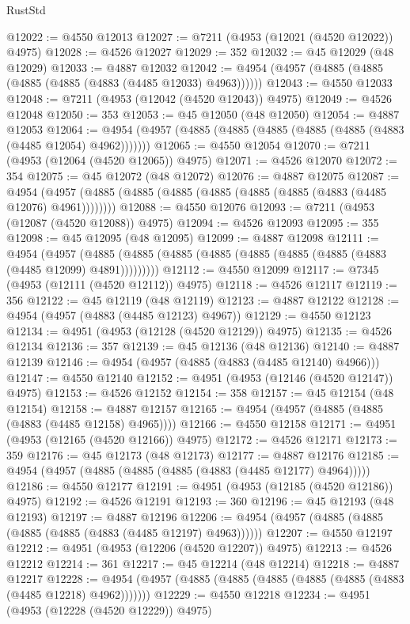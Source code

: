 \begin{lexlean}{RustStd}
\begin{coremodule}
@12022 := @4550 @12013
@12027 := @7211 (@4953 (@12021 (@4520 @12022)) @4975)
@12028 := @4526 @12027
@12029 := 352
@12032 := @45 @12029 (@48 @12029)
@12033 := @4887 @12032
@12042 := @4954 (@4957 (@4885 (@4885 (@4885 (@4885 (@4883 (@4485 @12033) @4963))))))
@12043 := @4550 @12033
@12048 := @7211 (@4953 (@12042 (@4520 @12043)) @4975)
@12049 := @4526 @12048
@12050 := 353
@12053 := @45 @12050 (@48 @12050)
@12054 := @4887 @12053
@12064 := @4954 (@4957 (@4885 (@4885 (@4885 (@4885 (@4885 (@4883 (@4485 @12054) @4962)))))))
@12065 := @4550 @12054
@12070 := @7211 (@4953 (@12064 (@4520 @12065)) @4975)
@12071 := @4526 @12070
@12072 := 354
@12075 := @45 @12072 (@48 @12072)
@12076 := @4887 @12075
@12087 := @4954 (@4957 (@4885 (@4885 (@4885 (@4885 (@4885 (@4885 (@4883 (@4485 @12076) @4961))))))))
@12088 := @4550 @12076
@12093 := @7211 (@4953 (@12087 (@4520 @12088)) @4975)
@12094 := @4526 @12093
@12095 := 355
@12098 := @45 @12095 (@48 @12095)
@12099 := @4887 @12098
@12111 := @4954
    (@4957 (@4885 (@4885 (@4885 (@4885 (@4885 (@4885 (@4885 (@4883 (@4485 @12099) @4891)))))))))
@12112 := @4550 @12099
@12117 := @7345 (@4953 (@12111 (@4520 @12112)) @4975)
@12118 := @4526 @12117
@12119 := 356
@12122 := @45 @12119 (@48 @12119)
@12123 := @4887 @12122
@12128 := @4954 (@4957 (@4883 (@4485 @12123) @4967))
@12129 := @4550 @12123
@12134 := @4951 (@4953 (@12128 (@4520 @12129)) @4975)
@12135 := @4526 @12134
@12136 := 357
@12139 := @45 @12136 (@48 @12136)
@12140 := @4887 @12139
@12146 := @4954 (@4957 (@4885 (@4883 (@4485 @12140) @4966)))
@12147 := @4550 @12140
@12152 := @4951 (@4953 (@12146 (@4520 @12147)) @4975)
@12153 := @4526 @12152
@12154 := 358
@12157 := @45 @12154 (@48 @12154)
@12158 := @4887 @12157
@12165 := @4954 (@4957 (@4885 (@4885 (@4883 (@4485 @12158) @4965))))
@12166 := @4550 @12158
@12171 := @4951 (@4953 (@12165 (@4520 @12166)) @4975)
@12172 := @4526 @12171
@12173 := 359
@12176 := @45 @12173 (@48 @12173)
@12177 := @4887 @12176
@12185 := @4954 (@4957 (@4885 (@4885 (@4885 (@4883 (@4485 @12177) @4964)))))
@12186 := @4550 @12177
@12191 := @4951 (@4953 (@12185 (@4520 @12186)) @4975)
@12192 := @4526 @12191
@12193 := 360
@12196 := @45 @12193 (@48 @12193)
@12197 := @4887 @12196
@12206 := @4954 (@4957 (@4885 (@4885 (@4885 (@4885 (@4883 (@4485 @12197) @4963))))))
@12207 := @4550 @12197
@12212 := @4951 (@4953 (@12206 (@4520 @12207)) @4975)
@12213 := @4526 @12212
@12214 := 361
@12217 := @45 @12214 (@48 @12214)
@12218 := @4887 @12217
@12228 := @4954 (@4957 (@4885 (@4885 (@4885 (@4885 (@4885 (@4883 (@4485 @12218) @4962)))))))
@12229 := @4550 @12218
@12234 := @4951 (@4953 (@12228 (@4520 @12229)) @4975)

\end{coremodule}
\end{lexlean}
